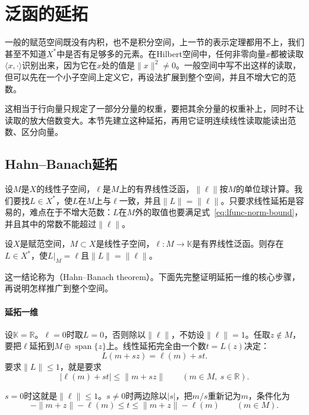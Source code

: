 \section{泛函的延拓}
\label{sec:lfunc-extension}

一般的赋范空间既没有内积，也不是积分空间，上一节的表示定理都用不上，我们甚至不知道$X^*$中是否有足够多的元素。在Hilbert空间中，任何非零向量$x$都被读取$\langle x,\cdot\rangle$识别出来，因为它在$x$处的值是$\lVert x\rVert^2\neq0$。一般空间中写不出这样的读取，但可以先在一个小子空间上定义它，再设法扩展到整个空间，并且不增大它的范数。

这相当于行向量只规定了一部分分量的权重，要把其余分量的权重补上，同时不让读取的放大倍数变大。本节先建立这种延拓，再用它证明连续线性读取能读出范数、区分向量。

\subsection{Hahn--Banach延拓}
\label{sec:lfunc-hahn-banach}

设$M$是$X$的线性子空间，$\ell$是$M$上的有界线性泛函，$\lVert\ell\rVert$按$M$的单位球计算。我们要找$L\in X^*$，使$L$在$M$上与$\ell$一致，并且$\lVert L\rVert=\lVert\ell\rVert$。只要求线性延拓是容易的，难点在于不增大范数：$L$在$M$外的取值也要满足式~\eqref{eq:lfunc-norm-bound}，并且其中的常数不能超过$\lVert\ell\rVert$。

\begin{theorem}
\label{thm:lfunc-hahn-banach}
设$X$是赋范空间，$M\subset X$是线性子空间，$\ell:M\to\mathbb K$是有界线性泛函。则存在$L\in X^*$，使$L|_M=\ell$且$\lVert L\rVert=\lVert\ell\rVert$。
\end{theorem}

这一结论称为（Hahn--Banach theorem）。下面先完整证明延拓一维的核心步骤，再说明怎样推广到整个空间。

\paragraph{延拓一维}
设$\mathbb K=\mathbb R$。$\ell=0$时取$L=0$，否则除以$\lVert\ell\rVert$，不妨设$\lVert\ell\rVert=1$。任取$z\notin M$，要把$\ell$延拓到$M\oplus\operatorname{span}\{z\}$上。线性延拓完全由一个数$t=L(z)$决定：
\[
L(m+sz)=\ell(m)+st .
\]
要求$\lVert L\rVert\leq1$，就是要求
\[
\lvert\ell(m)+st\rvert\leq\lVert m+sz\rVert\qquad(m\in M,\ s\in\mathbb R).
\]

$s=0$时这就是$\lVert\ell\rVert\leq1$。$s\neq0$时两边除以$\lvert s\rvert$，把$m/s$重新记为$m$，条件化为
\begin{equation}
-\lVert m+z\rVert-\ell(m)\leq t\leq\lVert m+z\rVert-\ell(m)\qquad(m\in M).
\label{eq:lfunc-hb-interval}
\end{equation}

